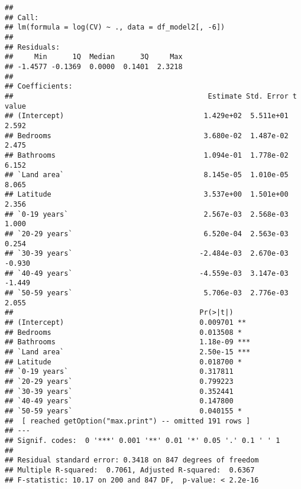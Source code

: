 \documentclass[
]{article}
\begin{document}
\begin{verbatim}
## 
## Call:
## lm(formula = log(CV) ~ ., data = df_model2[, -6])
## 
## Residuals:
##     Min      1Q  Median      3Q     Max 
## -1.4577 -0.1369  0.0000  0.1401  2.3218 
## 
## Coefficients:
##                                              Estimate Std. Error t value
## (Intercept)                                 1.429e+02  5.511e+01   2.592
## Bedrooms                                    3.680e-02  1.487e-02   2.475
## Bathrooms                                   1.094e-01  1.778e-02   6.152
## `Land area`                                 8.145e-05  1.010e-05   8.065
## Latitude                                    3.537e+00  1.501e+00   2.356
## `0-19 years`                                2.567e-03  2.568e-03   1.000
## `20-29 years`                               6.520e-04  2.563e-03   0.254
## `30-39 years`                              -2.484e-03  2.670e-03  -0.930
## `40-49 years`                              -4.559e-03  3.147e-03  -1.449
## `50-59 years`                               5.706e-03  2.776e-03   2.055
##                                            Pr(>|t|)    
## (Intercept)                                0.009701 ** 
## Bedrooms                                   0.013508 *  
## Bathrooms                                  1.18e-09 ***
## `Land area`                                2.50e-15 ***
## Latitude                                   0.018700 *  
## `0-19 years`                               0.317811    
## `20-29 years`                              0.799223    
## `30-39 years`                              0.352441    
## `40-49 years`                              0.147800    
## `50-59 years`                              0.040155 *  
##  [ reached getOption("max.print") -- omitted 191 rows ]
## ---
## Signif. codes:  0 '***' 0.001 '**' 0.01 '*' 0.05 '.' 0.1 ' ' 1
## 
## Residual standard error: 0.3418 on 847 degrees of freedom
## Multiple R-squared:  0.7061, Adjusted R-squared:  0.6367 
## F-statistic: 10.17 on 200 and 847 DF,  p-value: < 2.2e-16
\end{verbatim}
\end{document}
